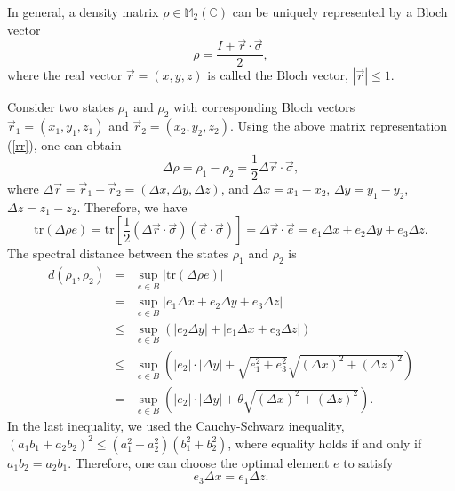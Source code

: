 \documentclass[a4paper,11pt]{article}
\begin{document}
In general, a density matrix $\rho \in  \mathbb{M}_2 (\mathbb{C})$ can be uniquely
represented by a Bloch vector {\cite{Nielsen}}
\begin{equation}\label{rr}
  \rho = \frac{I + \vec{r} \cdot \vec{\sigma}}{2},
\end{equation}
where the real vector $\vec{r} = (x, y, z)$ is called the Bloch vector, $|
\vec{r} | \leqslant 1$.

Consider two states $\rho_1$ and $\rho_2$ with corresponding Bloch vectors
$\vec{r}_1 = (x_1, y_1, z_1)$ and $\vec{r}_2 = (x_2, y_2, z_2)$. Using the above
matrix representation (\ref{rr}), one can obtain
\begin{equation}
  \Delta \rho = \rho_1 - \rho_2 = \frac{1}{2} \Delta \vec{r} \cdot
  \vec{\sigma},
\end{equation}
where $\Delta \vec{r} = \vec{r}_1 - \vec{r}_2 = (\Delta x, \Delta y, \Delta
z)$, and $\Delta x = x_1 - x_2$, $\Delta y = y_1 - y_2$, $\Delta z = z_1 -
z_2$. Therefore, we have
\begin{equation}
  \mathrm{tr} (\Delta \rho   e) = \mathrm{tr} \left[ \frac{1}{2}
  (\Delta \vec{r} \cdot \vec{\sigma}) (\vec{e} \cdot \vec{\sigma}) \right] =
  \Delta \vec{r} \cdot \vec{e} = e_1 \Delta x + e_2 \Delta y + e_3 \Delta z.
\end{equation}
The spectral distance between the states $\rho_1$ and $\rho_2$ is
\begin{eqnarray}\label{d12}
  d (\rho_1, \rho_2) & = & \sup_{e \in B} | \mathrm{tr} (\Delta \rho
    e) | \nonumber\\
  & = & \sup_{e \in B} |e_1 \Delta x + e_2 \Delta y + e_3 \Delta z|
  \nonumber\\
  & \leqslant & \sup_{e \in B} (|e_2 \Delta y| + |e_1 \Delta x + e_3 \Delta
  z|) \nonumber\\
  & \leqslant & \sup_{e \in B} \left( |e_2 | \cdot | \Delta y| + \sqrt{e_1^2
  + e_3^2}  \sqrt{(\Delta x)^2 + (\Delta z)^2} \right) \nonumber\\
  & = & \sup_{e \in B} \left( |e_2 | \cdot | \Delta y| + \theta \sqrt{(\Delta
  x)^2 + (\Delta z)^2} \right) . 
\end{eqnarray}
In the last inequality, we used the Cauchy-Schwarz inequality, $(a_1 b_1 + a_2
b_2)^2 \leqslant (a_1^2 + a_2^2)  (b_1^2 + b_2^2)$, where equality holds if
and only if $a_1 b_2 = a_2 b_1$. Therefore, one can choose the optimal element
$e$ to satisfy
\begin{equation}
  e_3 \Delta x = e_1 \Delta z.
\end{equation}
\end{document}
